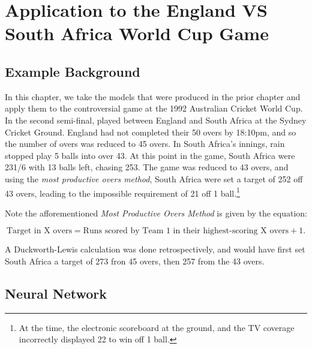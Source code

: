 \chapter{Application to the England VS South Africa World Cup Game}

\section{Example Background}
In this chapter, we take the models that were produced in the prior chapter and apply them to the controversial game at the 1992 Australian Cricket World Cup. In the second semi-final,
played between England and South Africa at the Sydney Cricket Ground. England had not completed their 50 overs by 18:10pm, and so the number of overs was reduced to 45 overs. In South Africa's
innings, rain stopped play 5 balls into over 43. At this point in the game, South Africa were 231/6 with 13 balls left, chasing 253. The game was reduced to 43 overs, and using the \textit{most 
productive overs method}, South Africa were set a target of 252 off 43 overs, leading to the impossible requirement of 21 off 1 ball.\footnote{At the time, the electronic scoreboard at the ground,
and the TV coverage incorrectly displayed 22 to win off 1 ball.}

Note the afforementioned \textit{Most Productive Overs Method} is given by the equation:

\begin{equation}
    \text{Target in X overs} = \text{Runs scored by Team 1 in their highest-scoring X overs} + 1.
\end{equation}

A Duckworth-Lewis calculation was done retrospectively, and would have first set South Africa a target of 273 fron 45 overs, then 257 from the 43 overs.

\section{Neural Network}

